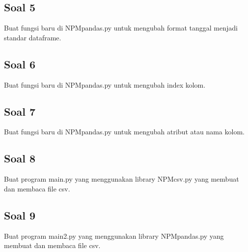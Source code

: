 

\subsection{Soal 5}
Buat fungsi baru di NPMpandas.py untuk mengubah format tanggal menjadi standar dataframe.



\subsection{Soal 6}
Buat fungsi baru di NPMpandas.py untuk mengubah index kolom.



\subsection{Soal 7}
Buat fungsi baru di NPMpandas.py untuk mengubah atribut atau nama kolom.



\subsection{Soal 8}
Buat program main.py yang menggunakan library NPMcsv.py yang membuat dan membaca file csv.



\subsection{Soal 9}
Buat program main2.py yang menggunakan library NPMpandas.py yang membuat dan membaca file csv.



